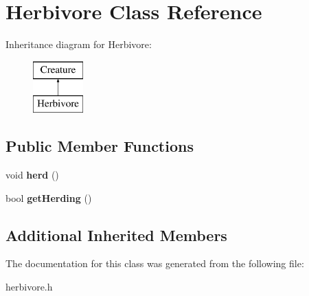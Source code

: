 \hypertarget{class_herbivore}{}\section{Herbivore Class Reference}
\label{class_herbivore}
Inheritance diagram for Herbivore\+:\begin{figure}[H]
\begin{center}
\leavevmode
\includegraphics[height=2.000000cm]{class_herbivore}
\end{center}
\end{figure}
\subsection*{Public Member Functions}
\begin{DoxyCompactItemize}
\item 
\mbox{\label{class_herbivore_aab17280ff23da5537d7ebffee5d4e4bd}} 
void {\bfseries herd} ()
\item 
\mbox{\label{class_herbivore_a1d428e1f3984436ad6a2985c6f03c451}} 
bool {\bfseries get\+Herding} ()
\end{DoxyCompactItemize}
\subsection*{Additional Inherited Members}


The documentation for this class was generated from the following file\+:\begin{DoxyCompactItemize}
\item 
herbivore.\+h\end{DoxyCompactItemize}
